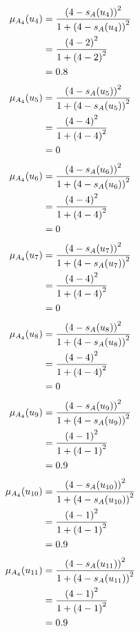 \documentclass[a4paper]{book}
\begin{document}
				\begin{align}
					\mu_{A_4}(u_4) &= \frac{\left(4-s_A(u_4)\right)^2}{1 + \left(4-s_A(u_4)\right)^2}\\
					&= \frac{\left(4-2\right)^2}{1 + \left(4-2\right)^2} \notag \\
					&= 0.8 \notag
				\end{align}
				\begin{align}
					\mu_{A_4}(u_5) &= \frac{\left(4-s_A(u_5)\right)^2}{1 + \left(4-s_A(u_5)\right)^2}\\
					&= \frac{\left(4-4\right)^2}{1 + \left(4-4\right)^2} \notag \\
					&= 0 \notag
				\end{align}
				\begin{align}
					\mu_{A_4}(u_6) &= \frac{\left(4-s_A(u_6)\right)^2}{1 + \left(4-s_A(u_6)\right)^2}\\
					&= \frac{\left(4-4\right)^2}{1 + \left(4-4\right)^2} \notag \\
					&= 0 \notag
				\end{align}
				\begin{align}
					\mu_{A_4}(u_7) &= \frac{\left(4-s_A(u_7)\right)^2}{1 + \left(4-s_A(u_7)\right)^2}\\
					&= \frac{\left(4-4\right)^2}{1 + \left(4-4\right)^2} \notag \\
					&= 0 \notag
				\end{align}
				\begin{align}
					\mu_{A_4}(u_8) &= \frac{\left(4-s_A(u_8)\right)^2}{1 + \left(4-s_A(u_8)\right)^2}\\
					&= \frac{\left(4-4\right)^2}{1 + \left(4-4\right)^2} \notag \\
					&= 0 \notag
				\end{align}
				\begin{align}
					\mu_{A_4}(u_9) &= \frac{\left(4-s_A(u_9)\right)^2}{1 + \left(4-s_A(u_9)\right)^2}\\
					&= \frac{\left(4-1\right)^2}{1 + \left(4-1\right)^2} \notag \\
					&= 0.9 \notag
				\end{align}
				\begin{align}
					\mu_{A_4}(u_{10}) &= \frac{\left(4-s_A(u_{10})\right)^2}{1 + \left(4-s_A(u_{10})\right)^2}\\
					&= \frac{\left(4-1\right)^2}{1 + \left(4-1\right)^2} \notag \\
					&= 0.9 \notag
				\end{align}
				\begin{align}
					\mu_{A_4}(u_{11}) &= \frac{\left(4-s_A(u_{11})\right)^2}{1 + \left(4-s_A(u_{11})\right)^2}\\
					&= \frac{\left(4-1\right)^2}{1 + \left(4-1\right)^2} \notag \\
					&= 0.9 \notag
				\end{align}
\end{document}
